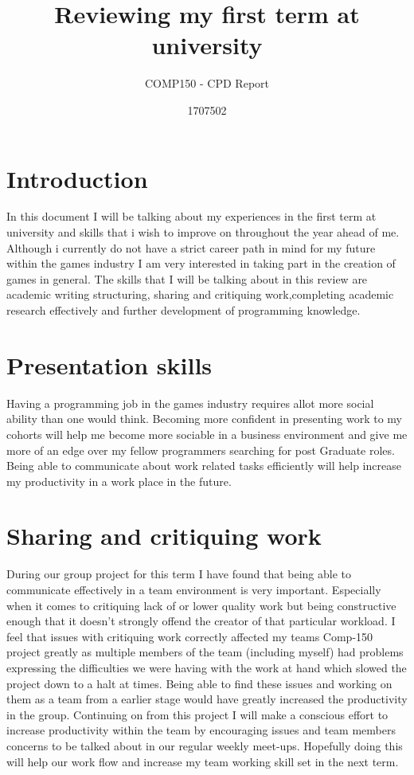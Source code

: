 \documentclass{scrartcl}
\title{Reviewing my first term at university}
\subtitle{COMP150 - CPD Report}
\author{1707502}
\begin{document}
\maketitle

\section{Introduction}
In this document I will be talking about my experiences in the first term at university and skills that i wish to improve on throughout the year ahead of me.
Although i currently do not have a strict career path in mind for my future within the games industry I am very interested in taking part in the creation of games in general. The skills that I will be talking about in this review are academic writing structuring, sharing and critiquing work,completing academic research effectively and further development of programming knowledge.   

\section{Presentation skills}
Having a programming job in the games industry requires allot more social ability than one would think. Becoming more confident in presenting work to my cohorts will help me become more sociable in a business environment and give me more of  an edge over my fellow programmers searching for post Graduate roles. Being able to communicate about work related tasks efficiently will help increase my productivity in a work place in the future.


\section{Sharing and critiquing work}

During our group project for this term I have found that being able to communicate effectively in a team environment is very important. Especially when it comes to critiquing lack of or lower quality work but being constructive enough that it doesn't strongly offend the creator of that particular workload. I feel that issues with critiquing work correctly affected my teams Comp-150 project greatly as multiple members of the team (including myself) had problems expressing the difficulties we were having with the work at hand which slowed the project down to a halt at times. Being able to find these issues and working on them as a team from a earlier stage would have greatly increased the productivity in the group. Continuing on from this project I will make a conscious effort to increase productivity within the team by encouraging issues and team members concerns to be talked about in our regular weekly meet-ups. Hopefully doing this will help our work flow and increase my team working skill set in the next term. 
\end{document}
